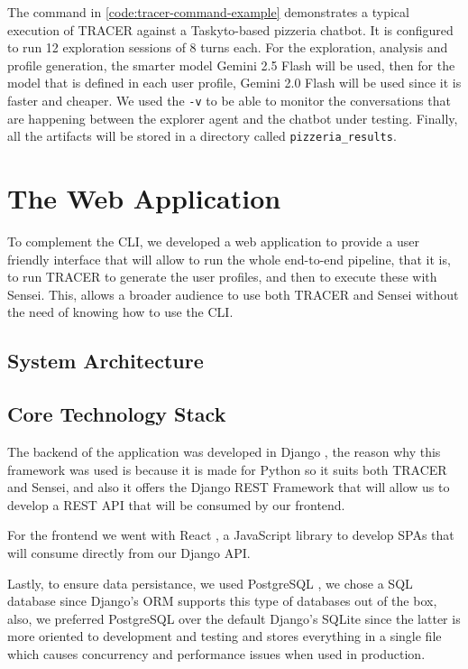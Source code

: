 The command in \autoref{code:tracer-command-example}
demonstrates a typical execution of \ac{TRACER} against a Taskyto-based pizzeria chatbot. 
It is configured to run 12 exploration sessions of 8 turns each.
For the exploration, analysis and profile generation, the smarter model Gemini 2.5 Flash will be used,
then for the model that is defined in each user profile, Gemini 2.0 Flash will be used since it is faster and cheaper.
We used the \texttt{-v} to be able to monitor the conversations that are happening
between the explorer agent and the chatbot under testing.
Finally, all the artifacts will be stored in a directory called \texttt{pizzeria\_results}.

\section{The Web Application}

To complement the \ac{CLI},
we developed a web application
to provide a user friendly interface that will allow to run the whole end-to-end pipeline,
that it is, to run \ac{TRACER} to generate the user profiles,
and then to execute these with Sensei.
This, allows a broader audience to use both \ac{TRACER} and Sensei
without the need of knowing how to use the \ac{CLI}.

\subsection{System Architecture}

\subsection{Core Technology Stack}

The backend of the application was developed in Django \autocite{Django},
the reason why this framework was used is because it is made for Python
so it suits both \ac{TRACER} and Sensei,
and also it offers the Django REST Framework \autocite{DjangoRESTFramework}
that will allow us to develop a \ac{REST} \ac{API} that will be consumed by our frontend.

For the frontend we went with React \autocite{React},
a JavaScript library to develop \acp{SPA}
that will consume directly from our Django \ac{API}.

Lastly, to ensure data persistance,
we used PostgreSQL \autocite{PostgreSQL2025},
we chose a \ac{SQL} database since Django's \ac{ORM} supports this type of databases out of the box,
also, we preferred PostgreSQL over the default Django's SQLite
since the latter is more oriented to development and testing
and stores everything in a single file which causes concurrency and performance issues when used in production.

